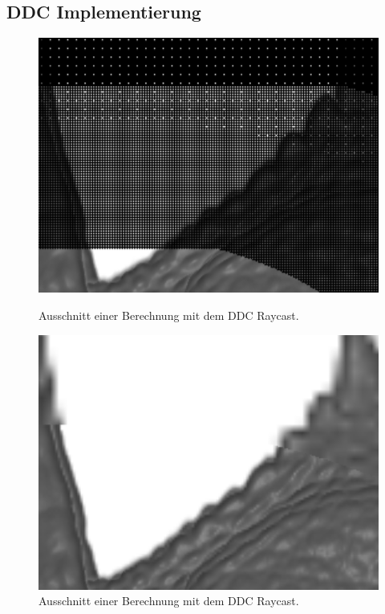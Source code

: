 \subsection{DDC Implementierung}
\begin{figure}[]
	\centering
	\begin{minipage}[t]{0.49\textwidth}
		\centering
		\includegraphics[width=1\textwidth]{../../Grafiken/results/implementierung/ddc_o_ip_cut.png}
		\caption{Ausschnitt einer Berechnung mit dem DDC Raycast.}
		\label{fig::imp::ddc_o_ip}
	\end{minipage}
	\hfill
	\begin{minipage}[t]{0.49\textwidth}
		\centering
		\includegraphics[width=1\textwidth]{../../Grafiken/results/implementierung/ddc_m_ip_cut.png}
		\caption{Ausschnitt einer Berechnung mit dem DDC Raycast.}
		\label{fig::imp::ddc_m_ip}
	\end{minipage}
\end{figure}
